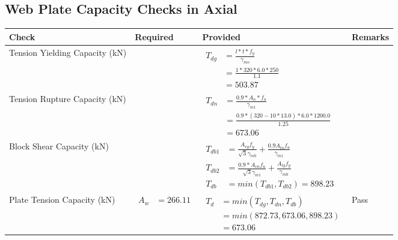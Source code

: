 \documentclass{article}%
\begin{document}
\subsection{Web Plate Capacity Checks in Axial}%
\label{subsec:WebPlateCapacityChecksinAxial}%
\renewcommand{\arraystretch}{1.2}%
\begin{longtable}{|p{4cm}|p{6cm}|p{5.5cm}|p{1.5cm}|}%
\hline%
\rowcolor{OsdagGreen}%
Check&Required&Provided&Remarks\\%
\hline%
\endhead%
\hline%
Tension Yielding Capacity (kN)&&$\begin{aligned} T_{dg} &= \frac{l*t*f_y}{\gamma_{mo}}\\ &=\frac{1*320*6.0*250}{1.1}\\ &=503.87\end{aligned}$&\\%
\hline%
Tension Rupture Capacity (kN)&&$\begin{aligned} T_{dn} &= \frac{0.9*A_{n}*f_u}{\gamma_{m1}}\\ &=\frac{0.9*(320-10*13.0)*6.0*1200.0}{1.25}\\ &=673.06\end{aligned}$&\\%
\hline%
Block Shear Capacity (kN)&&$\begin{aligned}T_{db1} &= \frac{A_{vg} f_{y}}{\sqrt{3} \gamma_{m0}} + \frac{0.9 A_{tn} f_{u}}{\gamma_{m1}}\\ T_{db2} &= \frac{0.9*A_{vn} f_{u}}{\sqrt{3} \gamma_{m1}} + \frac{A_{tg} f_{y}}{\gamma_{m0}}\\ T_{db} &= min(T_{db1}, T_{db2})= 898.23\end{aligned}$&\\%
\hline%
Plate Tension Capacity (kN)&$\begin{aligned} A_w &=266.11\end{aligned}$&$\begin{aligned} T_d &= min(T_{dg},T_{dn},T_{db})\\ &= min(872.73,673.06,898.23)\\ &=673.06\end{aligned}$&Pass\\%
\hline%
\end{longtable}

%
\newpage%
\end{document}
